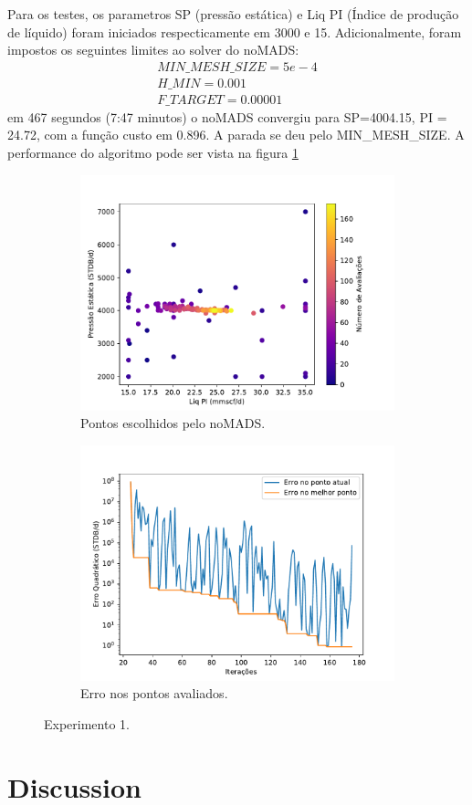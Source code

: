 Para os testes, os parametros SP (pressão estática) e Liq PI (Índice de produção de líquido) foram iniciados respecticamente em 3000 e 15.
Adicionalmente, foram impostos os seguintes limites ao solver do noMADS:
\begin{align}
MIN\_MESH\_SIZE = 5e-4\\
H\_MIN = 0.001\\
F\_TARGET = 0.00001
\end{align}
em 467 segundos (7:47 minutos) o noMADS convergiu para SP=4004.15, PI = 24.72, com a função custo em 0.896. A parada se deu pelo MIN\_MESH\_SIZE. A performance do algoritmo pode ser vista na figura \ref{fig:setup1_points}


\begin{figure}
\centering
\begin{subfigure}{0.5\textwidth}
  \centering
  \includegraphics[width=1\linewidth]{figs/setup1_eval_points.pdf}
  \caption{Pontos escolhidos pelo noMADS.}
  \label{fig:setup1_points}
\end{subfigure}%
\begin{subfigure}{0.5\textwidth}
  \centering
  \includegraphics[width=1\linewidth]{figs/setup1_errors.pdf}
  \caption{Erro nos pontos avaliados.}
  \label{fig:setup1_error}
\end{subfigure}
\caption{Experimento 1.}
\label{fig:setup1_2}
\end{figure}


\section{Discussion}





